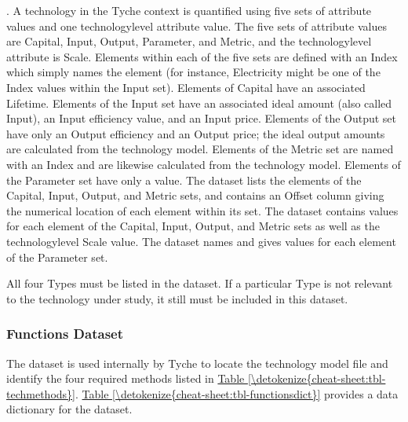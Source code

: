 \documentclass[letterpaper,10pt,english]{sphinxmanual}
\begin{document}
\sphinxAtStartPar
{}. A technology in the Tyche context is quantified using five sets of attribute values and one technology\sphinxhyphen{}level attribute value. The five sets of attribute values are Capital, Input, Output, Parameter, and Metric, and the technology\sphinxhyphen{}level attribute is Scale. Elements within each of the five sets are defined with an Index which simply names the element (for instance, Electricity might be one of the Index values within the Input set). Elements of Capital have an associated Lifetime. Elements of the Input set have an associated ideal amount (also called Input), an Input efficiency value, and an Input price. Elements of the Output set have only an Output efficiency and an Output price; the ideal output amounts are calculated from the technology model. Elements of the Metric set are named with an Index and are likewise calculated from the technology model. Elements of the Parameter set have only a value. The  dataset lists the elements of the Capital, Input, Output, and Metric sets, and contains an Offset column giving the numerical location of each element within its set. The  dataset contains values for each element of the Capital, Input, Output, and Metric sets as well as the technology\sphinxhyphen{}level Scale value. The  dataset names and gives values for each element of the Parameter set.

\sphinxAtStartPar
{} All four Types must be listed in the  dataset. If a particular Type is not relevant to the technology under study, it still must be included in this dataset.


\subsubsection{Functions Dataset}
\label{\detokenize{cheat-sheet:functions-dataset}}
\sphinxAtStartPar
The  dataset is used internally by Tyche to locate the technology model file and identify the four required methods listed in \hyperref[\detokenize{cheat-sheet:tbl-techmethods}]{Table \ref{\detokenize{cheat-sheet:tbl-techmethods}}}. \hyperref[\detokenize{cheat-sheet:tbl-functionsdict}]{Table \ref{\detokenize{cheat-sheet:tbl-functionsdict}}} provides a data dictionary for the  dataset.
\end{document}
